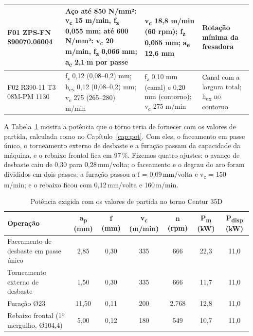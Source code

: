 \begin{table}[H]
{\begin{tabular}{|>{\raggedright\arraybackslash}p{2.9cm}|>{\raggedright\arraybackslash}p{4.4cm}|>{\raggedright\arraybackslash}p{3.0cm}|>{\raggedright\arraybackslash}p{4.4cm}|}
F01 ZPS-FN 890070.06004 & Aço até 850 N/mm²: v\textsubscript{c} 15 m/min, f\textsubscript{z} 0,055 mm; até 600 N/mm²: v\textsubscript{c} 20 m/min, f\textsubscript{z} 0,066 mm; a\textsubscript{e} 2,1$\cdot$m por passe & v\textsubscript{c} 18,8 m/min (60 rpm); f\textsubscript{z} 0,055 mm; a\textsubscript{e} 12,6 mm & Rotação mínima da fresadora \\ \hline
F02 R390-11 T3 08M-PM 1130 & f\textsubscript{z} 0,12 (0,08–0,2) mm; h\textsubscript{ex} 0,12 (0,08–0,2) mm; v\textsubscript{c} 275 (265–280) m/min & f\textsubscript{z} 0,10 mm (canal) e 0,20 mm (contorno); v\textsubscript{c} 275 m/min & Canal com a largura total; h\textsubscript{ex} no contorno \\ \hline
\end{tabular}}
\end{table}

A Tabela~\ref{tab:verif} mostra a potência que o torno teria de fornecer com os valores de partida, calculada como no Capítulo~\ref{cap:pot}. Com eles, o faceamento em passe único, o torneamento externo de desbaste e a furação passam da capacidade da máquina, e o rebaixo frontal fica em 97\,\%. Fizemos quatro ajustes: o avanço de desbaste caiu de 0,30 para 0,28\,mm/volta; o faceamento e o degrau do aro foram divididos em dois passes; a furação passou a f = 0,09\,mm/volta e v\textsubscript{c} = 150\,m/min; e o rebaixo ficou com 0,12\,mm/volta e 160\,m/min.

\begin{table}[H]
\centering
\caption{Potência exigida com os valores de partida no torno Centur 35D}\label{tab:verif}
{\small\renewcommand{\arraystretch}{1.2}
\begin{tabular}{|>{\raggedright\arraybackslash}p{4.2cm}|c|c|c|c|c|c|}
\hline
\rowcolor{cinza} \textbf{Operação} & \textbf{a\textsubscript{p} (mm)} & \textbf{f (mm)} & \textbf{v\textsubscript{c} (m/min)} & \textbf{n (rpm)} & \textbf{P\textsubscript{m} (kW)} & \textbf{P\textsubscript{disp} (kW)} \\ \hline
Faceamento de desbaste em passe único & 2,85 & 0,30 & 335 & 666 & 22,3 & 11,0\\ \hline
Torneamento externo de desbaste & 1,50 & 0,30 & 335 & 666 & 11,7 & 11,0\\ \hline
Furação Ø23 & 11,50 & 0,11 & 200 & 2.768 & 12,8 & 11,0\\ \hline
Rebaixo frontal (1º mergulho, Ø104,4) & 5,00 & 0,12 & 180 & 549 & 10,7 & 11,0\\ \hline
\end{tabular}}
\end{table}

